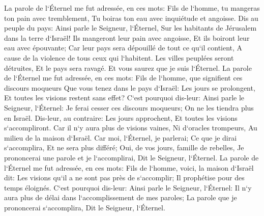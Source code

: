 \verse La parole de l`Éternel me fut adressée, en ces mots: 
\verse Fils de l`homme, tu mangeras ton pain avec tremblement, Tu boiras ton eau avec inquiétude et angoisse. 
\verse Dis au peuple du pays: Ainsi parle le Seigneur, l`Éternel, Sur les habitants de Jérusalem dans la terre d`Israël! Ils mangeront leur pain avec angoisse, Et ils boiront leur eau avec épouvante; Car leur pays sera dépouillé de tout ce qu`il contient, A cause de la violence de tous ceux qui l`habitent. 
\verse Les villes peuplées seront détruites, Et le pays sera ravagé. Et vous saurez que je suis l`Éternel. 
\verse La parole de l`Éternel me fut adressée, en ces mots: 
\verse Fils de l`homme, que signifient ces discours moqueurs Que vous tenez dans le pays d`Israël: Les jours se prolongent, Et toutes les visions restent sans effet? 
\verse C`est pourquoi dis-leur: Ainsi parle le Seigneur, l`Éternel: Je ferai cesser ces discours moqueurs; On ne les tiendra plus en Israël. Dis-leur, au contraire: Les jours approchent, Et toutes les visions s`accompliront. 
\verse Car il n`y aura plus de visions vaines, Ni d`oracles trompeurs, Au milieu de la maison d`Israël. 
\verse Car moi, l`Éternel, je parlerai; Ce que je dirai s`accomplira, Et ne sera plus différé; Oui, de vos jours, famille de rebelles, Je prononcerai une parole et je l`accomplirai, Dit le Seigneur, l`Éternel. 
\verse La parole de l`Éternel me fut adressée, en ces mots: 
\verse Fils de l`homme, voici, la maison d`Israël dit: Les visions qu`il a ne sont pas près de s`accomplir; Il prophétise pour des temps éloignés. 
\verse C`est pourquoi dis-leur: Ainsi parle le Seigneur, l`Éternel: Il n`y aura plus de délai dans l`accomplissement de mes paroles; La parole que je prononcerai s`accomplira, Dit le Seigneur, l`Éternel. 


